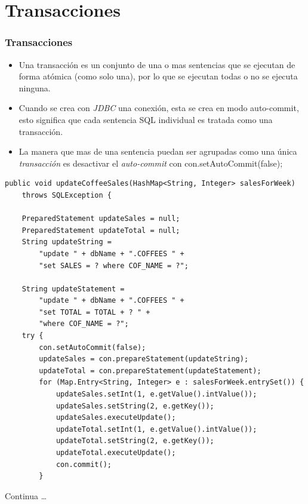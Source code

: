 \documentclass{beamer}
\begin{document}
\section{Transacciones}
\begin{frame}[fragile]
\frametitle{Transacciones}
\begin{tiny}
\begin{itemize}[<+->]
\item Una transacción es un conjunto de una o mas sentencias que se ejecutan de forma atómica (como solo una), por lo que se ejecutan todas o no se ejecuta ninguna.
\item Cuando se crea con \emph{JDBC} una conexión, esta se crea en modo \alert{auto-commit}, esto significa que cada sentencia SQL individual es tratada como una transacción.
\item La manera que mas de una sentencia puedan ser agrupadas como una única \emph{transacción} es desactivar el \emph{auto-commit} con \alert{con.setAutoCommit(false);}
\end{itemize}
\pause
\begin{verbatim}
public void updateCoffeeSales(HashMap<String, Integer> salesForWeek)
    throws SQLException {

    PreparedStatement updateSales = null;
    PreparedStatement updateTotal = null;
    String updateString =
        "update " + dbName + ".COFFEES " +
        "set SALES = ? where COF_NAME = ?";

    String updateStatement =
        "update " + dbName + ".COFFEES " +
        "set TOTAL = TOTAL + ? " +
        "where COF_NAME = ?";
    try {
        con.setAutoCommit(false);
        updateSales = con.prepareStatement(updateString);
        updateTotal = con.prepareStatement(updateStatement);
        for (Map.Entry<String, Integer> e : salesForWeek.entrySet()) {
            updateSales.setInt(1, e.getValue().intValue());
            updateSales.setString(2, e.getKey());
            updateSales.executeUpdate();
            updateTotal.setInt(1, e.getValue().intValue());
            updateTotal.setString(2, e.getKey());
            updateTotal.executeUpdate();
            con.commit();
        }
\end{verbatim}
\begin{center}
Continua \dots
\end{center}\end{tiny}
\end{frame}
\end{document}
